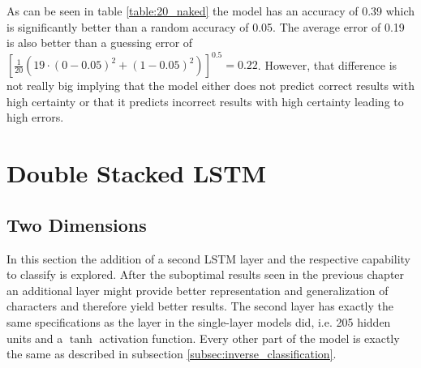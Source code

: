 As can be seen in table \ref{table:20_naked} the model has an accuracy of 0.39 which is significantly better than a random accuracy of 0.05. The average error of 0.19 is also better than a guessing error of $[\frac{1}{20}(19 \cdot (0-0.05)^2 + (1-0.05)^2)]^{0.5} = 0.22$. However, that difference is not really big implying that the model either does not predict correct results with high certainty or that it predicts incorrect results with high certainty leading to high errors. 

\section{Double Stacked LSTM}

\subsection{Two Dimensions}

In this section the addition of a second LSTM layer and the respective capability to classify is explored. After the suboptimal results seen in the previous chapter an additional layer might provide better representation and generalization of characters and therefore yield better results. The second layer has exactly the same specifications as the layer in the single-layer models did, i.e. 205 hidden units and a \textit{$\tanh$} activation function. Every other part of the model is exactly the same as described in subsection \ref{subsec:inverse_classification}.

